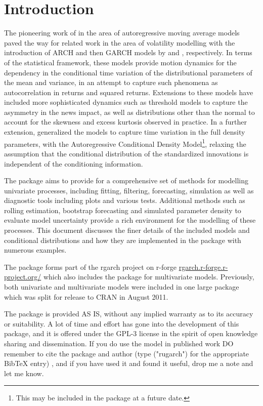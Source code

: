 \section{Introduction}
The pioneering work of \cite{Box1994} in the area of autoregressive moving
average models paved the way for related work in the area of volatility
modelling with the introduction of ARCH and then GARCH models by \cite{Engle1982}
and \cite{Bollerslev1986}, respectively. In terms of the statistical framework,
these models provide motion dynamics for the dependency in the conditional
time variation of the distributional parameters of the mean and variance, in an
attempt to capture such phenomena as autocorrelation in returns and squared
returns. Extensions to these models have included more sophisticated dynamics
such as threshold models to capture the asymmetry in the news impact, as well
as distributions other than the normal to account for the skewness and excess
kurtosis observed in practice. In a further extension, \cite{Hansen1994}
generalized the \verb@GARCH@ models to capture time variation in the full density
parameters, with the Autoregressive Conditional Density Model\footnote{This may
be included in the package at a future date.}, relaxing the assumption that the
conditional distribution of the standardized innovations is independent of the
conditioning information.

The \verb@rugarch@ package aims to provide for a comprehensive set of methods
for modelling univariate \verb@GARCH@ processes, including fitting, filtering,
forecasting, simulation as well as diagnostic tools including plots and various
tests. Additional methods such as rolling estimation, bootstrap forecasting and
simulated parameter density to evaluate model uncertainty provide a rich
environment for the modelling of these processes. This document discusses the
finer details of the included models and conditional distributions and
how they are implemented in the package with numerous examples.

The \verb@rugarch@ package forms part of the rgarch project on r-forge
\url{rgarch.r-forge.r-project.org/} which also includes the \verb@rmgarch@
package for multivariate \verb@GARCH@ models. Previously, both univariate and
multivariate models were included in one large package which was split for
release to CRAN in August 2011.

The package is provided AS IS, without any implied warranty as to its accuracy
or suitability. A lot of time and effort has gone into the development of this
package, and it is offered under the GPL-3 license in the spirit of open
knowledge sharing and dissemination. If you do use the model in published work
DO remember to cite the package and author (type \verb@citation@("rugarch") for
the appropriate BibTeX entry) , and if you have used it and found it
useful, drop me a note and let me know.

